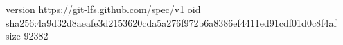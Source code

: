 version https://git-lfs.github.com/spec/v1
oid sha256:4a9d32d8aeafe3d2153620cda5a276f972b6a8386ef4411ed91cdf01d0c8f4af
size 92382
